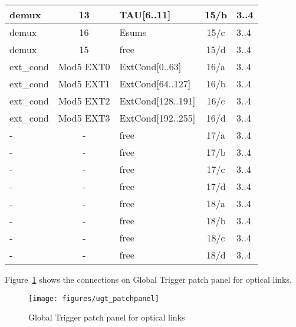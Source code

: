 \begin{longtable}{|l|c|l|c|l|}
demux & 13  & TAU[6..11] & 15/b & 3..4 \\\hline
demux & 16  & Esums      & 15/c & 3..4 \\\hline
demux & 15  & free       & 15/d & 3..4 \\\hline
ext\_cond & Mod5 EXT0 & ExtCond[0..63]    & 16/a & 3..4 \\\hline
ext\_cond & Mod5 EXT1 & ExtCond[64..127]  & 16/b & 3..4 \\\hline
ext\_cond & Mod5 EXT2 & ExtCond[128..191] & 16/c & 3..4 \\\hline
ext\_cond & Mod5 EXT3 & ExtCond[192..255] & 16/d & 3..4 \\\hline
- & - & free & 17/a & 3..4 \\\hline
- & - & free & 17/b & 3..4 \\\hline
- & - & free & 17/c & 3..4 \\\hline
- & - & free & 17/d & 3..4 \\\hline
- & - & free & 18/a & 3..4 \\\hline
- & - & free & 18/b & 3..4 \\\hline
- & - & free & 18/c & 3..4 \\\hline
- & - & free & 18/d & 3..4 \\\hline
\end{longtable}

Figure~\ref{fig:app:ugt_pp} shows the connections on Global Trigger patch panel for optical links.

\begin{figure}[htb]
\centering
\texttt{[image: figures/ugt\_patchpanel]}
\caption{Global Trigger patch panel for optical links}
\label{fig:app:ugt_pp}
\end{figure}

\clearpage

